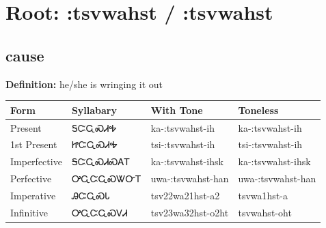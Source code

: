 \documentclass{article}%
\begin{document}
%
\normalsize%
\section*{Root: :tsvwahst / :tsvwahst}%
\subsection*{cause}%
\textbf{Definition: }%
he/she is wringing it out%
\\[0.5em]%
\begin{tabular}{|l|l|l|l|}%
\hline%
\textbf{Form}&\textbf{Syllabary}&\textbf{With Tone}&\textbf{Toneless}\\%
\hline%
Present&ᎦᏨᏩᏍᏗᎭ&ka{-}:tsvwahst{-}ih&ka{-}:tsvwahst{-}ih\\%
1st Present&ᏥᏨᏩᏍᏗᎭ&tsi{-}:tsvwahst{-}ih&tsi{-}:tsvwahst{-}ih\\%
Imperfective&ᎦᏨᏩᏍᏗᏍᎪᎢ&ka{-}:tsvwahst{-}ihsk&ka{-}:tsvwahst{-}ihsk\\%
Perfective&ᎤᏩᏨᏩᏍᏔᏅᎢ&uwa{-}:tsvwahst{-}han&uwa{-}:tsvwahst{-}han\\%
Imperative&ᎯᏨᏩᏍᏓ&tsv22wa21hst{-}a2&tsvwa1hst{-}a\\%
Infinitive&ᎤᏩᏨᏩᏍᏙᏗ&tsv23wa32hst{-}o2ht&tsvwahst{-}oht\\%
\hline%
\end{tabular}%
\\[1em]%
\end{document}

